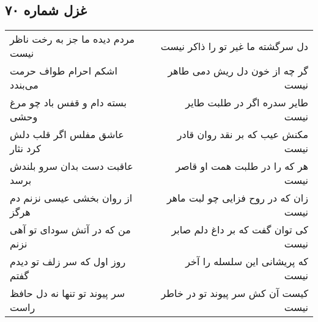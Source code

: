 \begin{center}
\section*{غزل شماره ۷۰}
\label{sec:sh070}
\begin{longtable}{l p{0.5cm} r}
مردم دیده ما جز به رخت ناظر نیست
&&
دل سرگشته ما غیر تو را ذاکر نیست
\\
اشکم احرام طواف حرمت می‌بندد
&&
گر چه از خون دل ریش دمی طاهر نیست
\\
بسته دام و قفس باد چو مرغ وحشی
&&
طایر سدره اگر در طلبت طایر نیست
\\
عاشق مفلس اگر قلب دلش کرد نثار
&&
مکنش عیب که بر نقد روان قادر نیست
\\
عاقبت دست بدان سرو بلندش برسد
&&
هر که را در طلبت همت او قاصر نیست
\\
از روان بخشی عیسی نزنم دم هرگز
&&
زان که در روح فزایی چو لبت ماهر نیست
\\
من که در آتش سودای تو آهی نزنم
&&
کی توان گفت که بر داغ دلم صابر نیست
\\
روز اول که سر زلف تو دیدم گفتم
&&
که پریشانی این سلسله را آخر نیست
\\
سر پیوند تو تنها نه دل حافظ راست
&&
کیست آن کش سر پیوند تو در خاطر نیست
\\
\end{longtable}
\end{center}
